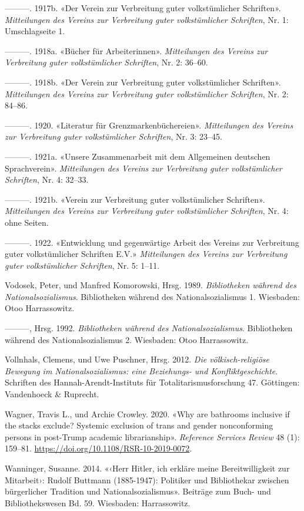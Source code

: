 \documentclass[a4paper,
fontsize=11pt,
oneside,
numbers=noperiodatend,
parskip=half-,
bibliography=totoc,
final
]{scrartcl}
\begin{document}
---------. 1917b. «Der Verein zur Verbreitung guter volkstümlicher
Schriften». \emph{Mitteilungen des Vereins zur Verbreitung guter
volkstümlicher Schriften}, Nr. 1: Umschlagseite 1.

---------. 1918a. «Bücher für Arbeiterinnen». \emph{Mitteilungen des
Vereins zur Verbreitung guter volkstümlicher Schriften}, Nr. 2: 36--60.

---------. 1918b. «Der Verein zur Verbreitung guter volkstümlicher
Schriften». \emph{Mitteilungen des Vereins zur Verbreitung guter
volkstümlicher Schriften}, Nr. 2: 84--86.

---------. 1920. «Literatur für Grenzmarkenbüchereien».
\emph{Mitteilungen des Vereins zur Verbreitung guter volkstümlicher
Schriften}, Nr. 3: 23--45.

---------. 1921a. «Unsere Zusammenarbeit mit dem Allgemeinen deutschen
Sprachverein». \emph{Mitteilungen des Vereins zur Verbreitung guter
volkstümlicher Schriften}, Nr. 4: 32--33.

---------. 1921b. «Verein zur Verbreitung guter volkstümlicher
Schriften». \emph{Mitteilungen des Vereins zur Verbreitung guter
volkstümlicher Schriften}, Nr. 4: ohne Seiten.

---------. 1922. «Entwicklung und gegenwärtige Arbeit des Vereins zur
Verbreitung guter volkstümlicher Schriften E.V.» \emph{Mitteilungen des
Vereins zur Verbreitung guter volkstümlicher Schriften}, Nr. 5: 1--11.

Vodosek, Peter, und Manfred Komorowski, Hrsg. 1989. \emph{Bibliotheken
während des Nationalsozialismus}. Bibliotheken während des
Nationalsozialismus 1. Wiesbaden: Otoo Harrassowitz.

---------, Hrsg. 1992. \emph{Bibliotheken während des
Nationalsozialismus}. Bibliotheken während des Nationalsozialismus 2.
Wiesbaden: Otoo Harrassowitz.

Vollnhals, Clemens, und Uwe Puschner, Hrsg. 2012. \emph{Die
völkisch-religiöse Bewegung im Nationalsozialismus: eine Beziehungs- und
Konfliktgeschichte}. Schriften des Hannah-Arendt-Instituts für
Totalitarismusforschung 47. Göttingen: Vandenhoeck \& Ruprecht.

Wagner, Travis L., und Archie Crowley. 2020. «Why are bathrooms
inclusive if the stacks exclude? Systemic exclusion of trans and gender
nonconforming persons in post-Trump academic librarianship».
\emph{Reference Services Review} 48 (1): 159--81.
\url{https://doi.org/10.1108/RSR-10-2019-0072}.

Wanninger, Susanne. 2014. «‹Herr Hitler, ich erkläre meine
Bereitwilligkeit zur Mitarbeit›: Rudolf Buttmann (1885-1947): Politiker
und Bibliothekar zwischen bürgerlicher Tradition und
Nationalsozialismus». Beiträge zum Buch- und Bibliothekswesen Bd. 59.
Wiesbaden: Harrassowitz.
\end{document}
